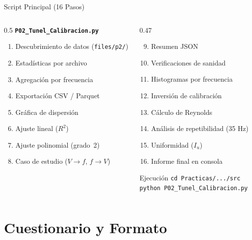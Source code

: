 \documentclass[aspectratio=169,12pt]{beamer}
\begin{document}
\begin{frame}{Script Principal (16 Pasos)}
	\begin{columns}
		\begin{column}{0.5\textwidth}
			\textbf{\texttt{P02\_Tunel\_Calibracion.py}}\\[0.3em]
			\scriptsize
			\begin{enumerate}
				\item Descubrimiento de datos (\texttt{files/p2/})
				\item Estadísticas por archivo
				\item Agregación por frecuencia
				\item Exportación CSV / Parquet
				\item Gráfica de dispersión
				\item Ajuste lineal ($R^2$)
				\item Ajuste polinomial (grado~2)
				\item Caso de estudio ($V \to f$, $f \to V$)
			\end{enumerate}
		\end{column}
		\begin{column}{0.47\textwidth}
			\scriptsize
			\begin{enumerate}
				\setcounter{enumi}{8}
				\item Resumen JSON
				\item Verificaciones de sanidad
				\item Histogramas por frecuencia
				\item Inversión de calibración
				\item Cálculo de Reynolds
				\item Análisis de repetibilidad (35 Hz)
				\item Uniformidad ($I_u$)
				\item Informe final en consola
			\end{enumerate}
			\vspace{0.3em}
			\begin{exampleblock}{Ejecución}
				\texttt{cd Practicas/.../src}\\
				\texttt{python P02\_Tunel\_Calibracion.py}
			\end{exampleblock}
		\end{column}
	\end{columns}
\end{frame}

\section{Cuestionario y Formato}
\end{document}
